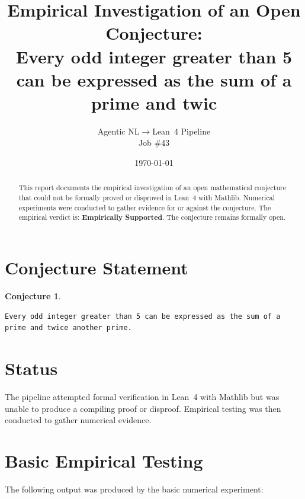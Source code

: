 \documentclass[11pt]{article}
\title{Empirical Investigation of an Open Conjecture:\\
Every odd integer greater than 5 can be expressed as the sum of a prime and twic}
\author{Agentic NL$\to$Lean~4 Pipeline \\ \small Job \#43}
\date{\today}
\newtheorem{conjecture}{Conjecture}
\begin{document}
\maketitle

\begin{abstract}
This report documents the empirical investigation of an open mathematical conjecture
that could not be formally proved or disproved in Lean~4 with Mathlib.
Numerical experiments were conducted to gather evidence for or against the conjecture.
The empirical verdict is: \textbf{\textcolor{green!70!black}{Empirically Supported}}.
The conjecture remains formally open.
\end{abstract}

\section{Conjecture Statement}

\begin{conjecture}
\begin{lstlisting}
Every odd integer greater than 5 can be expressed as the sum of a prime and twice another prime.
\end{lstlisting}
\end{conjecture}

\section{Status}

\begin{center}
\end{center}

The pipeline attempted formal verification in Lean~4 with Mathlib but was unable to
produce a compiling proof or disproof. Empirical testing was then conducted to gather
numerical evidence.

\section{Basic Empirical Testing}

The following output was produced by the basic numerical experiment:
\end{document}
